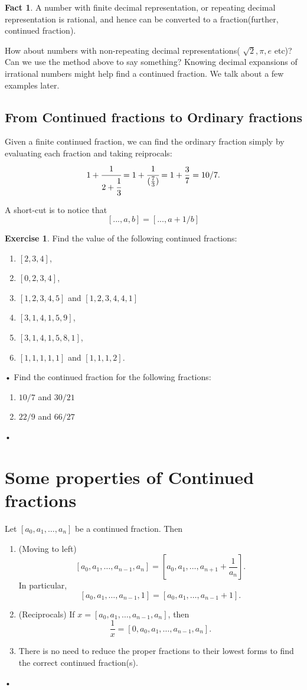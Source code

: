 \documentclass[12pt]{amsart}
\theoremstyle{definition}
\newtheorem{xca}[theorem]{Exercise}
\newtheorem{fact}[theorem]{Fact}
\theoremstyle{remark}
\numberwithin{equation}{section}
\begin{document}
\begin{fact}
A number with finite decimal representation, or repeating decimal representation is rational, and hence can be converted to a fraction(further, continued fraction).
\end{fact}

How about numbers with non-repeating decimal representations( $\sqrt{2}, \pi, e$ etc)? Can we use the method above to say something? Knowing decimal expansions of irrational numbers might help find a continued fraction. We talk about a few examples later.

\subsection{From Continued fractions to Ordinary fractions}
Given a finite continued fraction, we can find the ordinary fraction simply by evaluating each fraction and taking reiprocals:
\[1+ \cfrac{1}{2+\cfrac{1}{3}}=1+ \cfrac{1}{(\frac{7}{3})}=1+\frac{3}{7}=10/7.\]

A short-cut is to notice that
$$[ ... , a, b ] = [ ... , a + 1/b ]$$

\begin{xca}
Find the value of the following continued fractions:
\begin{enumerate}
\item $[2,3,4]$,
\item $[0,2,3,4]$,
\item $[1,2,3,4,5]$ and $[1,2,3,4,4,1]$
\item $[3,1,4,1,5,9]$,
\item $[ 3,1,4,1,5,8,1]$,
\item $[1,1,1,1,1]$ and $[1,1,1,2]$.
\end{enumerate}•
Find the continued fraction for the following fractions:
\begin{enumerate}
\item $10/7$ and $30/21$
\item $22/9$ and $66/27$
\end{enumerate}•


\end{xca}


\section{Some properties of Continued fractions}
Let $[a_0,a_1,\ldots, a_n]$ be a continued fraction. Then 
\begin{enumerate}
\item (Moving to left) \[ [a_0,a_1,\ldots, a_{n-1},a_n] = [ a_0,a_1,\ldots, a_{n+1} + \frac{1}{a_n} ].\] In particular, \[[a_0,a_1,\ldots, a_{n-1},1] = [a_0,a_1,\ldots, a_{n-1} + 1].\]
\item (Reciprocals) If $x=[a_0,a_1,\ldots, a_{n-1},a_n]$, then \[\frac{1}{x}=[0,a_0,a_1,\ldots, a_{n-1},a_n].\]
\item There is no need to reduce the proper fractions to their lowest forms to find the correct continued fraction(s).
\end{enumerate}•
\end{document}
